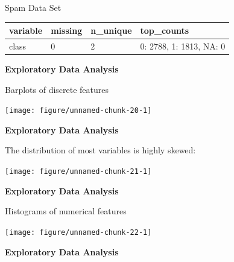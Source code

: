 \documentclass[11pt,compress,t,notes=noshow, xcolor=table]{beamer}
\newenvironment{knitrout}{}{} %
\begin{document}
\begin{vbframe}{Spam Data Set}
\begin{table}[H]
\begin{tabular}{llll}
\toprule
variable & missing & n\_unique & top\_counts\\
\midrule
class & 0 & 2 & 0: 2788, 1: 1813, NA: 0\\
\bottomrule
\end{tabular}\endgroup{}
\end{table}



\textbf{Exploratory Data Analysis}

Barplots of discrete features

\begin{knitrout}\scriptsize
{}\color{fgcolor}

{\centering \texttt{[image: figure/unnamed-chunk-20-1]} 

}



\end{knitrout}


\framebreak

\textbf{Exploratory Data Analysis}



The distribution of most variables is highly skewed:

\begin{knitrout}\tiny
{}\color{fgcolor}

{\centering \texttt{[image: figure/unnamed-chunk-21-1]} 

}



\end{knitrout}


\framebreak

\textbf{Exploratory Data Analysis}



Histograms of numerical features

\begin{knitrout}\tiny
{}\color{fgcolor}

{\centering \texttt{[image: figure/unnamed-chunk-22-1]} 

}



\end{knitrout}


\framebreak

\textbf{Exploratory Data Analysis}




\end{vbframe}
\end{document}
